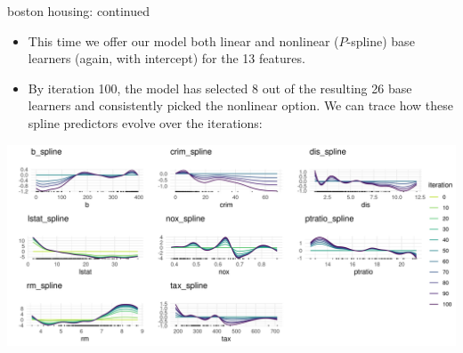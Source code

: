 
\begin{vbframe}{boston housing: continued}

\begin{itemize}
  \small
  \item This time we offer our model both
  linear and nonlinear ($P$-spline) base learners (again, with intercept) for
  the 13 features.
  \item By iteration 100, the model has selected 8 out of the resulting 26 base
  learners and consistently picked the nonlinear option.
  We can trace how these spline predictors evolve over the iterations:
\end{itemize}

\vfill

\begin{center}
\includegraphics[width = \textwidth]{figure/compboost-illustration-3.png}
\end{center}



\end{vbframe}


